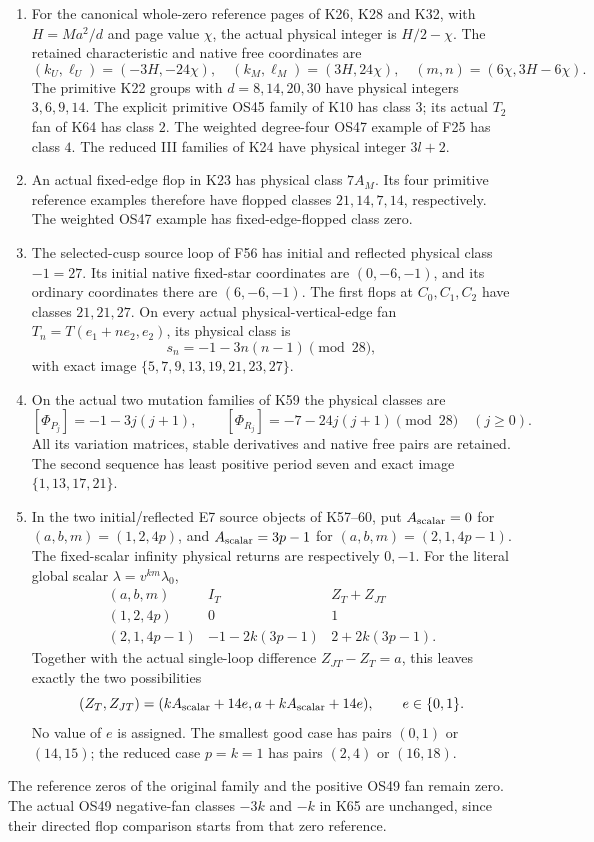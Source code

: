 \begin{theorem}
\begin{enumerate}
\item For the canonical whole-zero reference pages of K26, K28 and
K32, with \(H=Ma^2/d\) and page value \(\chi\), the actual physical
integer is \(H/2-\chi\). The retained characteristic and native free
coordinates are
\[
 (k_U,\ell_U)=(-3H,-24\chi),\quad
 (k_M,\ell_M)=(3H,24\chi),\quad
 (m,n)=(6\chi,3H-6\chi).
\]
The primitive K22 groups with \(d=8,14,20,30\) have physical integers
\(3,6,9,14\). The explicit primitive OS45 family of K10 has class
\(3\); its actual \(T_2\) fan of K64 has class \(2\).
The weighted degree-four OS47 example of F25 has class \(4\).
The reduced III families of K24 have physical integer \(3l+2\).
\item An actual fixed-edge flop in K23 has physical class
\(7A_M\). Its four primitive reference examples therefore have
flopped classes \(21,14,7,14\), respectively. The weighted OS47
example has fixed-edge-flopped class zero.
\item The selected-cusp source loop of F56 has initial and reflected
physical class \(-1=27\). Its initial native fixed-star coordinates
are \((0,-6,-1)\), and its ordinary coordinates there are
\((6,-6,-1)\). The first flops at \(C_0,C_1,C_2\) have classes
\(21,21,27\). On every actual physical-vertical-edge fan
\(T_n=T(e_1+ne_2,e_2)\), its physical class is
\[
                  s_n=-1-3n(n-1)\pmod{28},
\]
with exact image \(\{5,7,9,13,19,21,23,27\}\).
\item On the actual two mutation families of K59 the physical classes
are
\[
 [\Phi_{P_j}]=-1-3j(j+1),\qquad
 [\Phi_{R_j}]=-7-24j(j+1)\pmod{28}\quad(j\geq0).
\]
All its variation matrices, stable derivatives and native free pairs
are retained. The second sequence has least positive period seven
and exact image \(\{1,13,17,21\}\).
\item In the two initial/reflected E7 source objects of K57--60, put
\(A_{\rm scalar}=0\) for \((a,b,m)=(1,2,4p)\), and
\(A_{\rm scalar}=3p-1\) for \((a,b,m)=(2,1,4p-1)\).
The fixed-scalar infinity physical returns are respectively \(0,-1\).
For the literal global scalar \(\lambda=v^{km}\lambda_0\),
\[
\begin{array}{c|cc}
 (a,b,m)&I_T&Z_T+Z_{JT}\\\hline
 (1,2,4p)&0&1\\
 (2,1,4p-1)&-1-2k(3p-1)&2+2k(3p-1).
\end{array}
\]
Together with the actual single-loop difference \(Z_{JT}-Z_T=a\),
this leaves exactly the two possibilities
\[
 (Z_T,Z_{JT})=(kA_{\rm scalar}+14e,
                 a+kA_{\rm scalar}+14e),\qquad e\in\{0,1\}.
\]
No value of \(e\) is assigned. The smallest good case has pairs
\((0,1)\) or \((14,15)\); the reduced case \(p=k=1\) has pairs
\((2,4)\) or \((16,18)\).
\end{enumerate}
The reference zeros of the original family and the positive OS49
fan remain zero. The actual OS49 negative-fan classes \(-3k\) and
\(-k\) in K65 are unchanged, since their directed flop comparison
starts from that zero reference.
\end{theorem}

